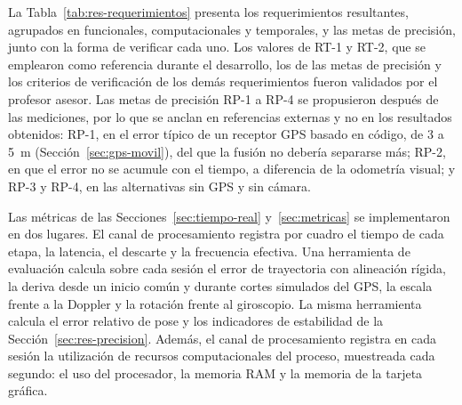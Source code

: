 La Tabla~\ref{tab:res-requerimientos} presenta los requerimientos resultantes, agrupados en funcionales, computacionales y temporales, y las metas de precisión, junto con la forma de verificar cada uno.
Los valores de RT-1 y RT-2, que se emplearon como referencia durante el desarrollo, los de las metas de precisión y los criterios de verificación de los demás requerimientos fueron validados por el profesor asesor.
Las metas de precisión RP-1 a RP-4 se propusieron después de las mediciones, por lo que se anclan en referencias externas y no en los resultados obtenidos: RP-1, en el error típico de un receptor GPS basado en código, de 3 a 5~m (Sección~\ref{sec:gps-movil}), del que la fusión no debería separarse más; RP-2, en que el error no se acumule con el tiempo, a diferencia de la odometría visual; y RP-3 y RP-4, en las alternativas sin GPS y sin cámara.

Las métricas de las Secciones~\ref{sec:tiempo-real} y~\ref{sec:metricas} se implementaron en dos lugares.
El canal de procesamiento registra por cuadro el tiempo de cada etapa, la latencia, el descarte y la frecuencia efectiva.
Una herramienta de evaluación calcula sobre cada sesión el error de trayectoria con alineación rígida, la deriva desde un inicio común y durante cortes simulados del GPS, la escala frente a la Doppler y la rotación frente al giroscopio.
La misma herramienta calcula el error relativo de pose y los indicadores de estabilidad de la Sección~\ref{sec:res-precision}.
Además, el canal de procesamiento registra en cada sesión la utilización de recursos computacionales del proceso, muestreada cada segundo: el uso del procesador, la memoria RAM y la memoria de la tarjeta gráfica.

